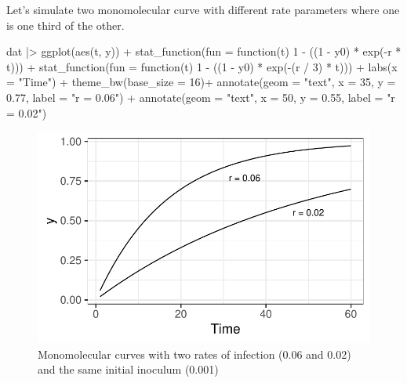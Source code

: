 \documentclass[
  letterpaper,
  DIV=11,
  numbers=noendperiod]{scrreprt}
\newenvironment{Shaded}{\begin{snugshade}}{\end{snugshade}}
\newcommand{\AttributeTok}[1]{\textcolor[rgb]{0.40,0.45,0.13}{#1}}
\newcommand{\ControlFlowTok}[1]{\textcolor[rgb]{0.00,0.23,0.31}{#1}}
\newcommand{\DecValTok}[1]{\textcolor[rgb]{0.68,0.00,0.00}{#1}}
\newcommand{\FloatTok}[1]{\textcolor[rgb]{0.68,0.00,0.00}{#1}}
\newcommand{\FunctionTok}[1]{\textcolor[rgb]{0.28,0.35,0.67}{#1}}
\newcommand{\NormalTok}[1]{\textcolor[rgb]{0.00,0.23,0.31}{#1}}
\newcommand{\SpecialCharTok}[1]{\textcolor[rgb]{0.37,0.37,0.37}{#1}}
\newcommand{\StringTok}[1]{\textcolor[rgb]{0.13,0.47,0.30}{#1}}
\begin{document}
Let's simulate two monomolecular curve with different rate parameters
where one is one third of the other.

\begin{Shaded}
\begin{Highlighting}[]
\NormalTok{dat }\SpecialCharTok{|\textgreater{}}
  \FunctionTok{ggplot}\NormalTok{(}\FunctionTok{aes}\NormalTok{(t, y)) }\SpecialCharTok{+}
  \FunctionTok{stat\_function}\NormalTok{(}\AttributeTok{fun =} \ControlFlowTok{function}\NormalTok{(t) }\DecValTok{1} \SpecialCharTok{{-}}\NormalTok{ ((}\DecValTok{1} \SpecialCharTok{{-}}\NormalTok{ y0) }\SpecialCharTok{*} \FunctionTok{exp}\NormalTok{(}\SpecialCharTok{{-}}\NormalTok{r }\SpecialCharTok{*}\NormalTok{ t))) }\SpecialCharTok{+}
  \FunctionTok{stat\_function}\NormalTok{(}\AttributeTok{fun =} \ControlFlowTok{function}\NormalTok{(t) }\DecValTok{1} \SpecialCharTok{{-}}\NormalTok{ ((}\DecValTok{1} \SpecialCharTok{{-}}\NormalTok{ y0) }\SpecialCharTok{*} \FunctionTok{exp}\NormalTok{(}\SpecialCharTok{{-}}\NormalTok{(r }\SpecialCharTok{/} \DecValTok{3}\NormalTok{) }\SpecialCharTok{*}\NormalTok{ t))) }\SpecialCharTok{+}
  \FunctionTok{labs}\NormalTok{(}\AttributeTok{x =} \StringTok{"Time"}\NormalTok{) }\SpecialCharTok{+}
  \FunctionTok{theme\_bw}\NormalTok{(}\AttributeTok{base\_size =} \DecValTok{16}\NormalTok{)}\SpecialCharTok{+}
  \FunctionTok{annotate}\NormalTok{(}\AttributeTok{geom =} \StringTok{"text"}\NormalTok{, }\AttributeTok{x =} \DecValTok{35}\NormalTok{, }\AttributeTok{y =} \FloatTok{0.77}\NormalTok{, }\AttributeTok{label =} \StringTok{"r = 0.06"}\NormalTok{) }\SpecialCharTok{+}
  \FunctionTok{annotate}\NormalTok{(}\AttributeTok{geom =} \StringTok{"text"}\NormalTok{, }\AttributeTok{x =} \DecValTok{50}\NormalTok{, }\AttributeTok{y =} \FloatTok{0.55}\NormalTok{, }\AttributeTok{label =} \StringTok{"r = 0.02"}\NormalTok{)}
\end{Highlighting}
\end{Shaded}

\begin{figure}[H]

{\centering \includegraphics{temporal-models_files/figure-pdf/fig-mono1-1.pdf}

}

\caption{\label{fig-mono1}Monomolecular curves with two rates of
infection (0.06 and 0.02) and the same initial inoculum (0.001)}

\end{figure}
\end{document}
